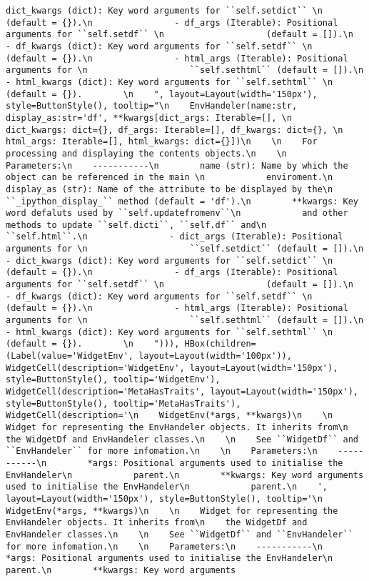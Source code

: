 \documentclass[11pt]{article}
\begin{document}
\begin{verbatim}
dict_kwargs (dict): Key word arguments for ``self.setdict`` \n                    (default = {}).\n                - df_args (Iterable): Positional arguments for ``self.setdf`` \n                    (default = []).\n                - df_kwargs (dict): Key word arguments for ``self.setdf`` \n                    (default = {}).\n                - html_args (Iterable): Positional arguments for \n                    ``self.sethtml`` (default = []).\n                - html_kwargs (dict): Key word arguments for ``self.sethtml`` \n                    (default = {}).        \n    ", layout=Layout(width='150px'), style=ButtonStyle(), tooltip="\n    EnvHandeler(name:str, display_as:str='df', **kwargs[dict_args: Iterable=[], \n        dict_kwargs: dict={}, df_args: Iterable=[], df_kwargs: dict={}, \n        html_args: Iterable=[], html_kwargs: dict={}])\n    \n    For processing and displaying the contents objects.\n    \n    Parameters:\n    -----------\n        name (str): Name by which the object can be referenced in the main \n            enviroment.\n        display_as (str): Name of the attribute to be displayed by the\n            ``_ipython_display_`` method (default = 'df').\n        **kwargs: Key word defaluts used by ``self.updatefromenv``\n            and other methods to update ``self.dicti``, ``self.df`` and\n            ``self.html``.\n                - dict_args (Iterable): Positional arguments for \n                    ``self.setdict`` (default = []).\n                - dict_kwargs (dict): Key word arguments for ``self.setdict`` \n                    (default = {}).\n                - df_args (Iterable): Positional arguments for ``self.setdf`` \n                    (default = []).\n                - df_kwargs (dict): Key word arguments for ``self.setdf`` \n                    (default = {}).\n                - html_args (Iterable): Positional arguments for \n                    ``self.sethtml`` (default = []).\n                - html_kwargs (dict): Key word arguments for ``self.sethtml`` \n                    (default = {}).        \n    "))), HBox(children=(Label(value='WidgetEnv', layout=Layout(width='100px')), WidgetCell(description='WidgetEnv', layout=Layout(width='150px'), style=ButtonStyle(), tooltip='WidgetEnv'), WidgetCell(description='MetaHasTraits', layout=Layout(width='150px'), style=ButtonStyle(), tooltip='MetaHasTraits'), WidgetCell(description='\n    WidgetEnv(*args, **kwargs)\n    \n    Widget for representing the EnvHandeler objects. It inherits from\n    the WidgetDf and EnvHandeler classes.\n    \n    See ``WidgetDf`` and ``EnvHandeler`` for more infomation.\n    \n    Parameters:\n    -----------\n        *args: Positional arguments used to initialise the EnvHandeler\n            parent.\n        **kwargs: Key word arguments used to initialise the EnvHandeler\n            parent.\n    ', layout=Layout(width='150px'), style=ButtonStyle(), tooltip='\n    WidgetEnv(*args, **kwargs)\n    \n    Widget for representing the EnvHandeler objects. It inherits from\n    the WidgetDf and EnvHandeler classes.\n    \n    See ``WidgetDf`` and ``EnvHandeler`` for more infomation.\n    \n    Parameters:\n    -----------\n        *args: Positional arguments used to initialise the EnvHandeler\n            parent.\n        **kwargs: Key word arguments 
\end{verbatim}
\end{document}
